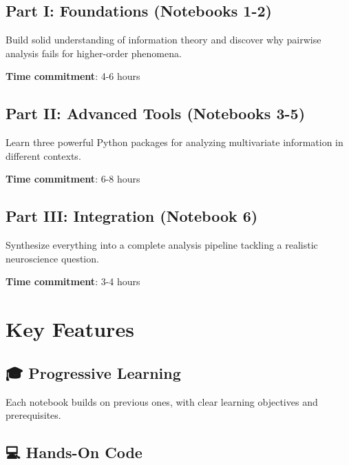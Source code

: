 \documentclass[
  11pt,
  letterpaper,
  oneside,
  openany]{book}
\begin{document}
\subsection*{Part I: Foundations (Notebooks
1-2)}\label{part-i-foundations-notebooks-1-2}

Build solid understanding of information theory and discover why
pairwise analysis fails for higher-order phenomena.

\textbf{Time commitment}: 4-6 hours

\subsection*{Part II: Advanced Tools (Notebooks
3-5)}\label{part-ii-advanced-tools-notebooks-3-5}

Learn three powerful Python packages for analyzing multivariate
information in different contexts.

\textbf{Time commitment}: 6-8 hours

\subsection*{Part III: Integration (Notebook
6)}\label{part-iii-integration-notebook-6}

Synthesize everything into a complete analysis pipeline tackling a
realistic neuroscience question.

\textbf{Time commitment}: 3-4 hours

\section*{Key Features}\label{key-features}


\subsection*{🎓 Progressive Learning}\label{progressive-learning}

Each notebook builds on previous ones, with clear learning objectives
and prerequisites.

\subsection*{💻 Hands-On Code}\label{hands-on-code}
\end{document}
